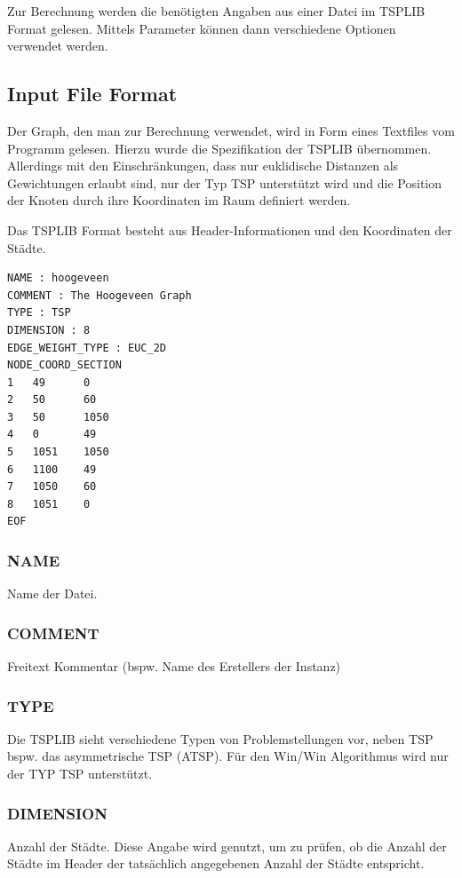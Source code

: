 \documentclass[11pt,a4paper]{article}
\begin{document}
Zur Berechnung werden die benötigten Angaben aus einer Datei im TSPLIB Format gelesen. Mittels Parameter können dann verschiedene Optionen verwendet werden.

\subsection{Input File Format}
Der Graph, den man zur Berechnung verwendet, wird in Form eines Textfiles vom Programm gelesen. Hierzu wurde die Spezifikation der TSPLIB übernommen. Allerdings mit den Einschränkungen, dass nur euklidische Distanzen als Gewichtungen erlaubt sind, nur der Typ TSP unterstützt wird und die Position der Knoten durch ihre Koordinaten im Raum definiert werden.

Das TSPLIB Format besteht aus Header-Informationen und den Koordinaten der Städte.

\begin{verbatim}
NAME : hoogeveen 
COMMENT : The Hoogeveen Graph 
TYPE : TSP 
DIMENSION : 8 
EDGE_WEIGHT_TYPE : EUC_2D
NODE_COORD_SECTION
1   49      0   
2   50      60  
3   50      1050
4   0       49  
5   1051    1050
6   1100    49  
7   1050    60  
8   1051    0   
EOF
\end{verbatim}

\subsubsection{NAME}
Name der Datei.

\subsubsection{COMMENT}
Freitext Kommentar (bspw. Name des Erstellers der Instanz)

\subsubsection{TYPE}
Die TSPLIB sieht verschiedene Typen von Problemstellungen vor, neben TSP bspw. das asymmetrische TSP (ATSP). Für den Win/Win Algorithmus wird nur der TYP TSP unterstützt.

\subsubsection{DIMENSION}
Anzahl der Städte. Diese Angabe wird genutzt, um zu prüfen, ob die Anzahl der Städte im Header der tatsächlich angegebenen Anzahl der Städte entspricht.
\end{document}
